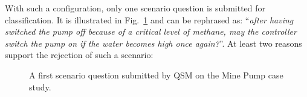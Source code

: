 With such a configuration, only one scenario question is submitted for classification. It is illustrated in Fig.~\ref{image:minepump-scenario-question} and can be rephrased as: ``\emph{after having switched the pump off because of a critical level of methane, may the controller switch the pump on if the water becomes high once again?}''. At least two reasons support the rejection of such a scenario:

\begin{figure}
\centering
{}
\caption{A first scenario question submitted by QSM on the Mine Pump case study.\label{image:minepump-scenario-question}}
\end{figure}

